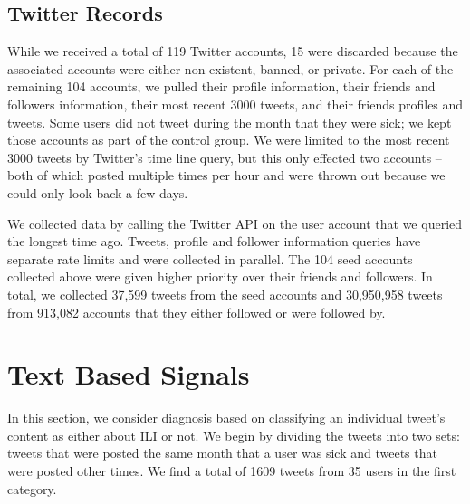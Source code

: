 \documentclass{acm_proc_article-sp}
\begin{document}
\subsection{Twitter Records}
While we received a total of 119 Twitter accounts, 15 were discarded because the associated accounts were either non-existent, banned, or private. For each of the remaining 104 accounts, we pulled their profile information, their friends and followers information, their most recent 3000 tweets, and their friends profiles and tweets. Some users did not tweet during the month that they were sick; we kept those accounts as part of the control group. We were limited to the most recent 3000 tweets by Twitter's time line query, but this only effected two accounts -- both of which posted multiple times per hour and were thrown out because we could only look back a few days.

We collected data by calling the Twitter API on the user account that we queried the longest time ago. Tweets, profile and follower information queries have separate rate limits and were collected in parallel. The 104 seed accounts collected above were given higher priority over their friends and followers. In total, we collected 37,599 tweets from the seed accounts and 30,950,958 tweets from 913,082 accounts that they either followed or were followed by.


\section{Text Based Signals}
\label{sec:text_analysis}

In this section, we consider diagnosis based on classifying an individual tweet's content as either about ILI or not. We begin by dividing the tweets into two sets: tweets that were posted the same month that a user was sick and tweets that were posted other times. We find a total of 1609 tweets from 35 users in the first category.
\end{document}
